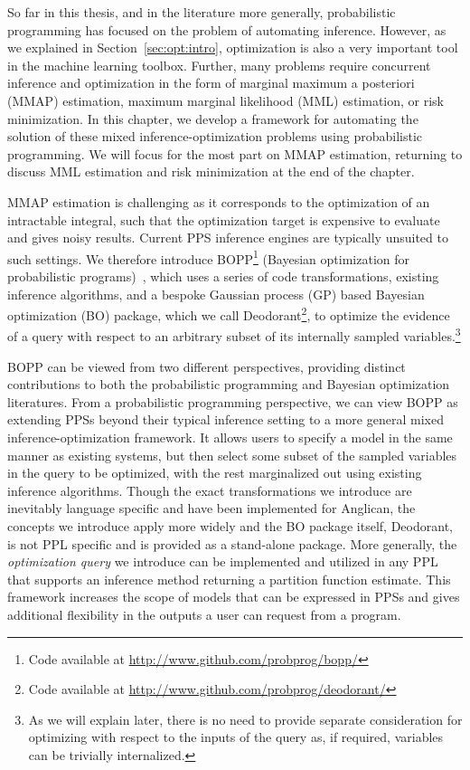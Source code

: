 
So far in this thesis, and in the literature more generally, probabilistic programming has focused
on the problem of automating inference.  However, as we explained in Section~\ref{sec:opt:intro},
optimization is also a very important tool in the machine learning toolbox.  Further, many problems
require concurrent inference and optimization in the form of marginal maximum a posteriori (MMAP) estimation,
maximum marginal likelihood (MML) estimation, or risk minimization.  In this chapter, we develop a framework
for automating the solution of these mixed inference-optimization problems using probabilistic programming.
We will focus for the most part on
MMAP estimation, returning to discuss MML estimation and risk minimization at the end of the chapter.

MMAP estimation is challenging as it corresponds to the optimization of an intractable integral, such that the 
optimization target is expensive to evaluate and gives noisy results.  Current PPS inference engines are 
typically unsuited to such settings.  We therefore introduce BOPP\footnote{Code available at \url{http://www.github.com/probprog/bopp/}}
(Bayesian optimization for probabilistic programs)~\citep{rainforth2015workshopbopp,rainforth2016bayesian}, 
which uses a series of code transformations, existing inference algorithms,
and a bespoke Gaussian process (GP) based Bayesian optimization (BO) package, which we call Deodorant\footnote{Code available
at \url{http://www.github.com/probprog/deodorant/}}, to optimize the evidence of a query with respect to
an arbitrary subset of its internally sampled variables.\footnote{As we will explain later, there is no need to
	provide separate consideration for optimizing with respect to the inputs of the query as, if required,
	variables can be trivially internalized.}

BOPP can be viewed from two different perspectives, providing distinct contributions to both the probabilistic
programming and Bayesian optimization literatures.  From a probabilistic programming perspective, we can
view BOPP as extending PPSs beyond their typical inference setting to a more
general mixed inference-optimization framework.  It allows users to specify a model in the same manner 
as existing systems, but then select some subset of the sampled variables in the query to be optimized, 
with the rest marginalized out using existing inference algorithms.  Though the exact transformations we
introduce are inevitably language specific and have been implemented for Anglican, the concepts we
introduce apply more widely and the BO package itself, Deodorant, is not PPL specific and is provided
as a stand-alone package.  More generally, the \textit{optimization query} we 
introduce can be implemented and utilized in any PPL that supports an inference method returning a 
partition function estimate.  This framework increases the scope of models that can be expressed in
PPSs and gives additional flexibility in the outputs a user can request from a program.

